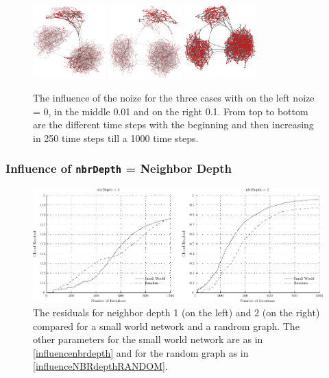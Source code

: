 \begin{figure}
\includegraphics[width=0.25\textwidth]{batchRun__kHalf=2-2-2_maxUpdate=0.02_noize=0_nbrDepth=1/network1000-crop.pdf}
\hfill
\includegraphics[width=0.25\textwidth]{batchRun__kHalf=2-2-2_maxUpdate=0.02_noize=0.01_nbrDepth=1/network1000-crop.pdf}
\hfill
\includegraphics[width=0.25\textwidth]{batchRun__kHalf=2-2-2_maxUpdate=0.02_noize=0.1_nbrDepth=1/network1000-crop.pdf}

\caption{The influence of the noize for the three cases with on the left noize
  = 0, in the middle 0.01 and on the right 0.1. From top to bottom are the
  different time steps with the beginning and then increasing in 250 time steps
  till a 1000 time steps.}
\label{influencenoize}
\end{figure}



\subsubsection{Influence of \texttt{nbrDepth} = Neighbor Depth}
\label{sec:nbrDepth}

\begin{figure}
\centering
\includegraphics[width= \textwidth]{influenceOfNbrDepth/influenceNbrDepth.pdf}
\caption{The residuals for neighbor depth 1 (on the left) and 2 (on the right)
  compared for a small world network and a randrom graph. The other parameters
  for the small world network are as in \ref{influencenbrdepth} and for the
  random graph as in \ref{influenceNBRdepthRANDOM}.}
\label{residualNBRdepth}
\end{figure}

